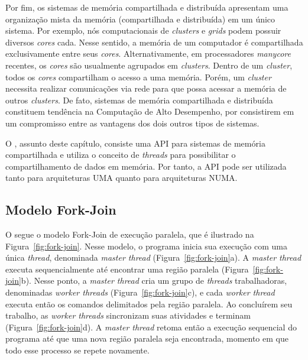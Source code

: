 \documentclass{SBCbookchapter}
\begin{document}
		Por fim, os sistemas de memória compartilhada e distribuída
		apresentam uma organização mista da memória (compartilhada e
		distribuída) em um único sistema. Por exemplo, nós
		computacionais de \textit{clusters} e \textit{grids} podem
		possuir diversos \textit{cores} cada. Nesse sentido, a memória
		de um computador é compartilhada exclusivamente entre seus
		\textit{cores}. Alternativamente, em processadores
		\textit{manycore} recentes, os \textit{cores} são usualmente
		agrupados em \textit{clusters}. Dentro de um \textit{cluster},
		todos os \textit{cores} compartilham o acesso a uma memória.
		Porém, um \textit{cluster} necessita realizar comunicações via
		rede para que possa acessar a memória de outros
		\textit{clusters}. De fato, sistemas de memória compartilhada e
		distribuída constituem tendência na Computação de Alto
		Desempenho, por consistirem em um compromisso entre as vantagens
		dos dois outros tipos de sistemas.

		O \openmp, assunto deste capítulo, consiste uma API para
		sistemas de memória compartilhada e utiliza o conceito de
		\textit{threads} para possibilitar o compartilhamento de dados
		em memória. Por tanto, a API pode ser utilizada tanto para
		arquiteturas UMA quanto para arquiteturas NUMA.
		
	\subsection{Modelo Fork-Join}

		O \openmp segue o modelo Fork-Join de execução paralela, que é
		ilustrado na Figura~\ref{fig:fork-join}. Nesse modelo, o
		programa inicia sua execução com uma única \textit{thread},
		denominada \textit{master thread} (Figura~\ref{fig:fork-join}a).
		A \textit{master thread} executa sequencialmente até encontrar
		uma região paralela (Figura~\ref{fig:fork-join}b). Nesse ponto,
		a \textit{master thread} cria um grupo de \textit{threads}
		trabalhadoras, denominadas \textit{worker threads}
		(Figura~\ref{fig:fork-join}c), e cada \textit{worker thread}
		executa então os comandos delimitados pela região paralela. Ao
		concluírem seu trabalho, as \textit{worker threads} sincronizam
		suas atividades e terminam (Figura~\ref{fig:fork-join}d). A
		\textit{master thread} retoma então a execução sequencial do
		programa até que uma nova região paralela seja encontrada,
		momento em que todo esse processo se repete novamente.
		
\end{document}
